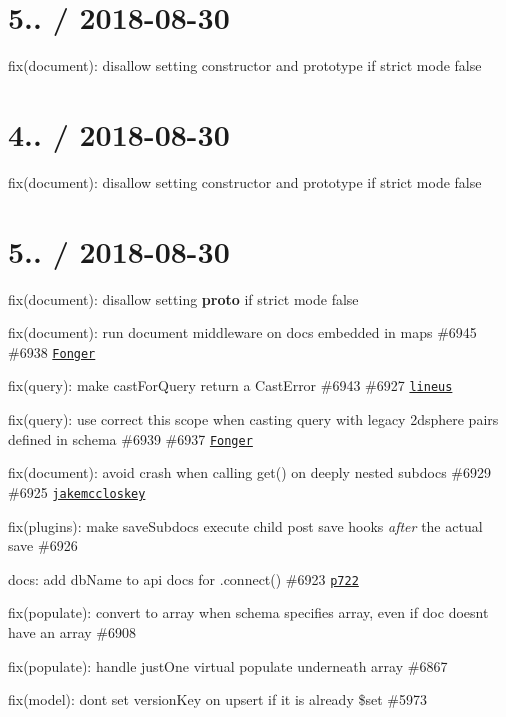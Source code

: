 \section*{5.. / 2018-\/08-\/30 }


\begin{DoxyItemize}
\item fix(document)\+: disallow setting {\ttfamily constructor} and {\ttfamily prototype} if strict mode false
\end{DoxyItemize}

\section*{4.. / 2018-\/08-\/30 }


\begin{DoxyItemize}
\item fix(document)\+: disallow setting {\ttfamily constructor} and {\ttfamily prototype} if strict mode false
\end{DoxyItemize}

\section*{5.. / 2018-\/08-\/30 }


\begin{DoxyItemize}
\item fix(document)\+: disallow setting {\bfseries proto} if strict mode false
\item fix(document)\+: run document middleware on docs embedded in maps \#6945 \#6938 \href{https://github.com/Fonger}{\tt Fonger}
\item fix(query)\+: make cast\+For\+Query return a Cast\+Error \#6943 \#6927 \href{https://github.com/lineus}{\tt lineus}
\item fix(query)\+: use correct {\ttfamily this} scope when casting query with legacy 2dsphere pairs defined in schema \#6939 \#6937 \href{https://github.com/Fonger}{\tt Fonger}
\item fix(document)\+: avoid crash when calling {\ttfamily get()} on deeply nested subdocs \#6929 \#6925 \href{https://github.com/jakemccloskey}{\tt jakemccloskey}
\item fix(plugins)\+: make save\+Subdocs execute child post save hooks {\itshape after} the actual save \#6926
\item docs\+: add db\+Name to api docs for .connect() \#6923 \href{https://github.com/p722}{\tt p722}
\item fix(populate)\+: convert to array when schema specifies array, even if doc doesn\textquotesingle{}t have an array \#6908
\item fix(populate)\+: handle {\ttfamily just\+One} virtual populate underneath array \#6867
\item fix(model)\+: dont set version\+Key on upsert if it is already {\ttfamily \$set} \#5973
\end{DoxyItemize}

